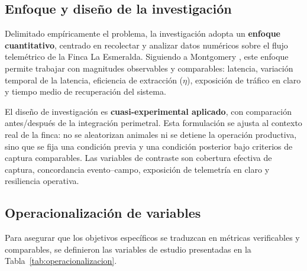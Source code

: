 \subsection{Enfoque y diseño de la investigación}
Delimitado empíricamente el problema, la investigación adopta un \textbf{enfoque cuantitativo}, centrado en recolectar y analizar datos numéricos sobre el flujo telemétrico de la Finca La Esmeralda. Siguiendo a Montgomery \cite{montgomery2019}, este enfoque permite trabajar con magnitudes observables y comparables: latencia, variación temporal de la latencia, eficiencia de extracción ($\eta$), exposición de tráfico en claro y tiempo medio de recuperación del sistema.

El diseño de investigación es \textbf{cuasi-experimental aplicado}, con comparación antes/después de la integración perimetral. Esta formulación se ajusta al contexto real de la finca: no se aleatorizan animales ni se detiene la operación productiva, sino que se fija una condición previa y una condición posterior bajo criterios de captura comparables. Las variables de contraste son cobertura efectiva de captura, concordancia evento--campo, exposición de telemetría en claro y resiliencia operativa.

\subsection{Operacionalización de variables}
Para asegurar que los objetivos específicos se traduzcan en métricas verificables y comparables, se definieron las variables de estudio presentadas en la Tabla~\ref{tab:operacionalizacion}.

